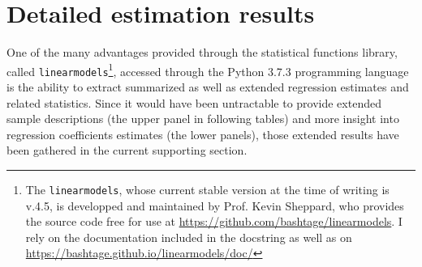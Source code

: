 \section{Detailed estimation results}
\label{app:sec:DetailedResults}
One of the many advantages provided through the statistical functions library, called \texttt{linearmodels}\footnote{The \texttt{linearmodels}, whose current stable version at the time of writing is v.4.5, is developped and maintained by Prof. Kevin Sheppard, who provides the source code free for use at \url{https://github.com/bashtage/linearmodels}. I rely on the documentation included in the docstring as well as on \url{https://bashtage.github.io/linearmodels/doc/}}, accessed through the Python 3.7.3 programming language is the ability to extract summarized as well as extended regression estimates and related statistics. Since it would have been untractable to provide extended sample descriptions (the upper panel in following tables) and more insight into regression coefficients estimates (the lower panels), those extended results have been gathered in the current supporting section.

